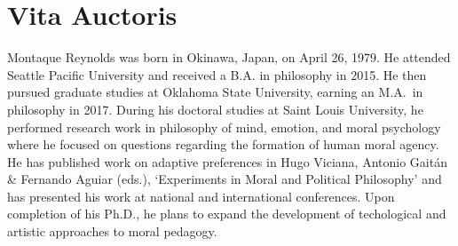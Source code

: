 \documentclass[phdthesis,12pt,final,a4paper]{wuthesis}
\theoremstyle{definition}
\theoremstyle{definition}
\theoremstyle{definition}
\theoremstyle{definition}
\theoremstyle{remark}
\begin{document}
\backmatter

\cleardoublepage
{}
{}
\chapter*{Vita Auctoris}
\begin{doublespace}
Montaque Reynolds was born in Okinawa, Japan, on April 26, 1979. He attended Seattle Pacific University and received a B.A. in philosophy in 2015. He then pursued graduate studies at Oklahoma State University, earning an M.A.~in philosophy in 2017. During his doctoral studies at Saint Louis University, he performed research work in philosophy of mind, emotion, and moral psychology where he focused on questions regarding the formation of human moral agency. He has published work on adaptive preferences in Hugo Viciana, Antonio Gaitán \& Fernando Aguiar (eds.), `Experiments in Moral and Political Philosophy' and has presented his work at national and international conferences. Upon completion of his Ph.D., he plans to expand the development of techological and artistic approaches to moral pedagogy.
\end{doublespace}

\end{document}

